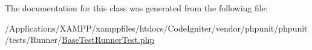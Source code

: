 The documentation for this class was generated from the following file\+:\begin{DoxyCompactItemize}
\item 
/\+Applications/\+X\+A\+M\+P\+P/xamppfiles/htdocs/\+Code\+Igniter/vendor/phpunit/phpunit/tests/\+Runner/\mbox{\hyperlink{_base_test_runner_test_8php}{Base\+Test\+Runner\+Test.\+php}}\end{DoxyCompactItemize}
